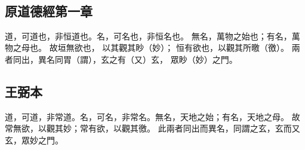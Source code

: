 ﻿%
%

\chapter{~}

\section{原道德經第一章}

\begin{withgezhu}

\zhsong


道，可道也，非恒道也。\colorbox{missing-color}{名，可名也，非恒名也}。
無名，萬物之始也；有名，萬物之母也。
\colorbox{adding-color}{故}垣無欲也，
以其觀其眇（\textcolor{tongjia-color}{妙}）；
恒有欲也，以觀其所曒（\textcolor{tongjia-color}{徼}）。
兩者同出，異名同胃（\textcolor{tongjia-color}{謂}），玄之有（\textcolor{tongjia-color}{又}）玄，
眾眇（\textcolor{tongjia-color}{妙}）之\colorbox{adding-color}{門}。

\end{withgezhu}

\section{王弼本}

\begin{withgezhu}

\zhsong

道，可道，非常道。名，可名，非常名。無名，天地之始；有名，天地之母。
故常無欲，以觀其妙；常有欲，以觀其徼。
此兩者同出而異名，同謂之玄，玄而又玄，眾妙之門。

\end{withgezhu}
